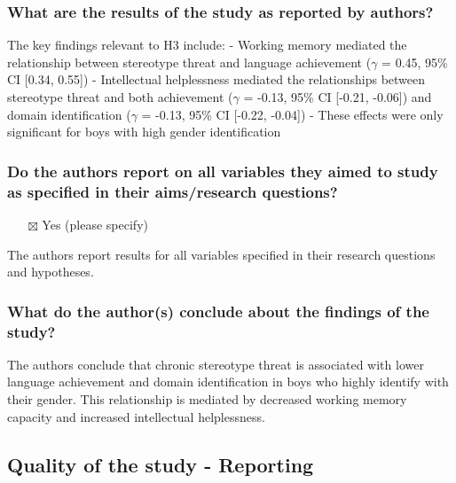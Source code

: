 \documentclass[
  doc, a4paper]{apa7}
\providecommand{\tightlist}{%
  \setlength{\itemsep}{0pt}\setlength{\parskip}{0pt}}
\begin{document}
\subsubsection{What are the results of the study as reported by authors?}\label{what-are-the-results-of-the-study-as-reported-by-authors}

The key findings relevant to H3 include:
- Working memory mediated the relationship between stereotype threat and language achievement (\(\gamma\) = 0.45, 95\% CI {[}0.34, 0.55{]})
- Intellectual helplessness mediated the relationships between stereotype threat and both achievement (\(\gamma\) = -0.13, 95\% CI {[}-0.21, -0.06{]}) and domain identification (\(\gamma\) = -0.13, 95\% CI {[}-0.22, -0.04{]})
- These effects were only significant for boys with high gender identification

\subsubsection{Do the authors report on all variables they aimed to study as specified in their aims/research questions?}\label{do-the-authors-report-on-all-variables-they-aimed-to-study-as-specified-in-their-aimsresearch-questions}

\begin{itemize}
\tightlist
\item[$\boxtimes$]
  Yes (please specify)
\end{itemize}

The authors report results for all variables specified in their research questions and hypotheses.

\subsubsection{What do the author(s) conclude about the findings of the study?}\label{what-do-the-authors-conclude-about-the-findings-of-the-study}

The authors conclude that chronic stereotype threat is associated with lower language achievement and domain identification in boys who highly identify with their gender. This relationship is mediated by decreased working memory capacity and increased intellectual helplessness.

\subsection{Quality of the study - Reporting}\label{quality-of-the-study---reporting}
\end{document}
